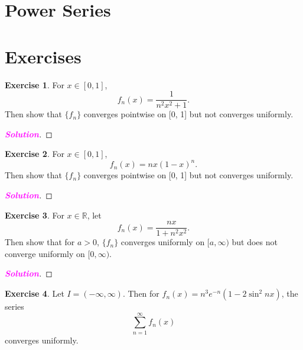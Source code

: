 \documentclass[12pt,openany]{book}
\theoremstyle{definition}
\newtheorem{exercise}{Exercise}[chapter]
\newcommand{\sol}{\textcolor{magenta}{\bf Solution}}
\begin{document}
	\section{Power Series}
	\newpage
	\section{Exercises}
	\begin{tcolorbox}[colframe=execolor, title={\color{white}\bf}]
		\begin{exercise}
			For \( x \in [0, 1] \),
			\[ f_n(x) = \frac{1}{n^2x^2 + 1}. \]
			Then show that \( \{f_n\} \) converges pointwise on [0, 1] but not converges uniformly.
		\end{exercise}
	\end{tcolorbox}
	\begin{proof}[\sol]
		
	\end{proof}
	\begin{tcolorbox}[colframe=execolor, title={\color{white}\bf}]
		\begin{exercise}
			For \( x \in [0, 1] \),
			\[ f_n(x) = nx(1 - x)^n. \]
			Then show that \( \{f_n\} \) converges pointwise on [0, 1] but not converges uniformly.
		\end{exercise}
	\end{tcolorbox}
	\begin{proof}[\sol]
		
	\end{proof}
	\begin{tcolorbox}[colframe=execolor, title={\color{white}\bf}]
		\begin{exercise}
			For \( x \in \mathbb{R} \), let
			\[ f_n(x) = \frac{nx}{1 + n^2x^2}. \]
			Then show that for \( a > 0 \), \( \{f_n\} \) converges uniformly on \([a, \infty)\) but does not converge uniformly on \([0, \infty)\).
		\end{exercise}
	\end{tcolorbox}
	\begin{proof}[\sol]
		
	\end{proof}
	\begin{tcolorbox}[colframe=execolor, title={\color{white}\bf}]
		\begin{exercise}
			Let \( I = (-\infty, \infty) \). Then for \( f_n(x) = n^3e^{-n}(1 - 2\sin^2 nx) \), the series
			\[ \sum_{n=1}^{\infty} f_n(x) \]
			converges uniformly.
		\end{exercise}
	\end{tcolorbox}
\end{document}
